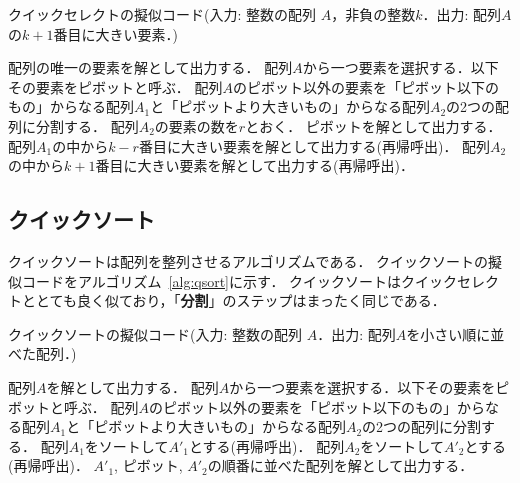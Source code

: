 \documentclass[a4paper,twoside,onecolumn,openany,article]{memoir}
\theoremstyle{remark}
\begin{document}
\begin{algorithm}
\caption{クイックセレクトの擬似コード(入力: 整数の配列 $A$，非負の整数$k$．出力: 配列$A$の$k+1$番目に大きい要素．)}
\label{alg:qselect}
\begin{algorithmic}
  \State 配列の唯一の要素を解として出力する．
\Else
  \State 配列$A$から一つ要素を選択する．以下その要素をピボットと呼ぶ．
  \State 配列$A$のピボット以外の要素を「ピボット以下のもの」からなる配列$A_1$と「ピボットより大きいもの」からなる配列$A_2$の2つの配列に分割する．
  \State 配列$A_2$の要素の数を$r$とおく．
    \State ピボットを解として出力する．
    \State 配列$A_1$の中から$k-r$番目に大きい要素を解として出力する(再帰呼出)．
  \Else
    \State 配列$A_2$の中から$k+1$番目に大きい要素を解として出力する(再帰呼出)．
  \EndIf
\EndIf
\end{algorithmic}
\end{algorithm}


\subsection{クイックソート}
クイックソートは配列を整列させるアルゴリズムである．
クイックソートの擬似コードをアルゴリズム~\ref{alg:qsort}に示す．
クイックソートはクイックセレクトととても良く似ており，「\textbf{分割}」のステップはまったく同じである．

\begin{algorithm}
\caption{クイックソートの擬似コード(入力: 整数の配列 $A$．出力: 配列$A$を小さい順に並べた配列．)}
\label{alg:qsort}
\begin{algorithmic}
  \State 配列$A$を解として出力する．
\Else
  \State 配列$A$から一つ要素を選択する．以下その要素をピボットと呼ぶ．
  \State 配列$A$のピボット以外の要素を「ピボット以下のもの」からなる配列$A_1$と「ピボットより大きいもの」からなる配列$A_2$の2つの配列に分割する．
  \State 配列$A_1$をソートして$A'_1$とする(再帰呼出)．
  \State 配列$A_2$をソートして$A'_2$とする(再帰呼出)．
  \State $A'_1$, ピボット, $A'_2$の順番に並べた配列を解として出力する．
\EndIf
\end{algorithmic}
\end{algorithm}
\end{document}
